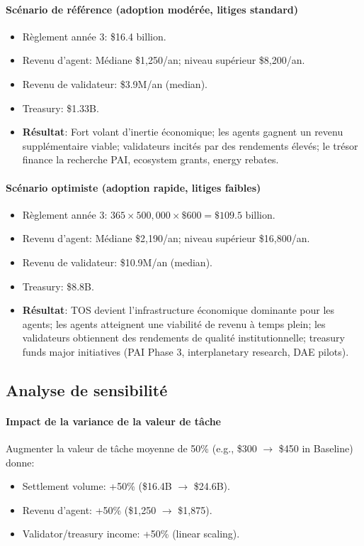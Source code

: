 \documentclass[11pt]{article}
\begin{document}
\paragraph{Scénario de référence (adoption modérée, litiges standard)}
\begin{itemize}[noitemsep]
  \item Règlement année 3: \$16.4 billion.
  \item Revenu d'agent: Médiane \$1{,}250/an; niveau supérieur \$8{,}200/an.
  \item Revenu de validateur: \$3.9M/an (median).
  \item Treasury: \$1.33B.
  \item \textbf{Résultat}: Fort volant d'inertie économique; les agents gagnent un revenu supplémentaire viable; validateurs incités par des rendements élevés; le trésor finance la recherche PAI, ecosystem grants, energy rebates.
\end{itemize}

\paragraph{Scénario optimiste (adoption rapide, litiges faibles)}
\begin{itemize}[noitemsep]
  \item Règlement année 3: $365 \times 500{,}000 \times \$600 = \$109.5$ billion.
  \item Revenu d'agent: Médiane \$2{,}190/an; niveau supérieur \$16{,}800/an.
  \item Revenu de validateur: \$10.9M/an (median).
  \item Treasury: \$8.8B.
  \item \textbf{Résultat}: TOS devient l'infrastructure économique dominante pour les agents; les agents atteignent une viabilité de revenu à temps plein; les validateurs obtiennent des rendements de qualité institutionnelle; treasury funds major initiatives (PAI Phase 3, interplanetary research, DAE pilots).
\end{itemize}

\subsection{Analyse de sensibilité}
\paragraph{Impact de la variance de la valeur de tâche}
Augmenter la valeur de tâche moyenne de 50\% (e.g., \$300 $\to$ \$450 in Baseline) donne:
\begin{itemize}[noitemsep]
  \item Settlement volume: +50\% (\$16.4B $\to$ \$24.6B).
  \item Revenu d'agent: +50\% (\$1{,}250 $\to$ \$1{,}875).
  \item Validator/treasury income: +50\% (linear scaling).
\end{itemize}
\end{document}

